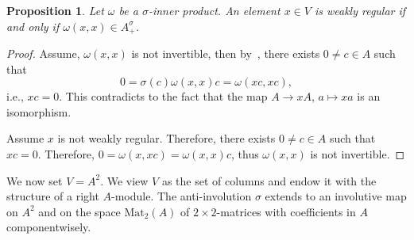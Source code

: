 \documentclass[oneside,11pt]{amsart}
\newtheorem{prop}[thm]{Proposition}
\theoremstyle{definition}
\theoremstyle{remark}
\numberwithin{thm}{section}
\numberwithin{equation}{section}
\begin{document}
\begin{prop}
    Let $\omega$ be a $\sigma$-inner product. An element $x\in V$ is weakly regular if and only if $\omega(x,x)\in A_+^\sigma$.  
\end{prop}

\begin{proof}
    Assume, $\omega(x,x)$ is not invertible, then by~\cite[Proposition~2.27]{ABRRW}, there exists $0
    \neq c\in A$ such that 
    $$0=\sigma(c)\omega(x,x)c=\omega(xc,xc),$$ 
    i.e., $xc=0$. This contradicts to the fact that the map $A\to xA$, $a\mapsto xa$ is an isomorphism.

    Assume $x$ is not weakly regular. Therefore, there exists $0 \neq c\in A$ such that $xc=0$. Therefore,  $0=\omega(x,xc)=\omega(x,x)c$, thus $\omega(x,x)$ is not invertible. 
\end{proof}

We now set $V=A^2$. We view $V$ as the set of columns and endow it with the structure of a right $A$-module. The anti-involution $\sigma$ extends to an involutive map on $A^2$ and on the space $\mathrm{Mat}_2(A)$ of $2\times2$-matrices with coefficients in $A$ componentwisely.
\end{document}
